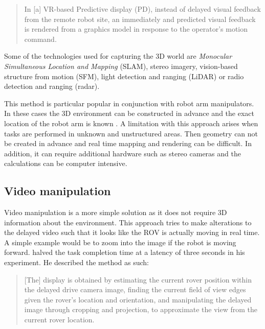 \begin{quote}
\small In [a] VR-based Predictive display (PD), instead of delayed visual feedback from the remote robot site, an immediately and predicted visual feedback is rendered from a graphics model in response to the operator's motion command.
\end{quote}


Some of the technologies used for capturing the 3D world are \textit{Monocular Simultaneous Location and Mapping} (SLAM), stereo imagery, vision-based structure from motion (SFM), light detection and ranging (LiDAR) or radio detection and ranging (radar).

This method is particular popular in conjunction with robot arm manipulators. In these cases the 3D environment can be constructed in advance and the exact location of the robot arm is known \citep{Ricks2004}. A limitation with this approach arises when tasks are performed in unknown and unstructured areas. Then geometry can not be created in advance and real time mapping and rendering can be difficult. In addition, it can require additional hardware such as stereo cameras and the calculations can be computer intensive.



\subsection{Video manipulation}

Video manipulation is a more simple solution as it does not require 3D information about the environment. This approach tries to make alterations to the delayed video such that it looks like the ROV is actually moving in real time. A simple example would be to zoom into the image if the robot is moving forward. \citet{Matheson2013} halved the task completion time at a latency of three seconds in his experiment. He described the method as such:

\begin{quote}
\small [The] display is obtained by estimating the current rover position within the delayed drive camera image, finding the current field of view edges given the rover’s location and orientation, and manipulating the delayed image through cropping and projection, to approximate the view from the current rover location.
\end{quote}

